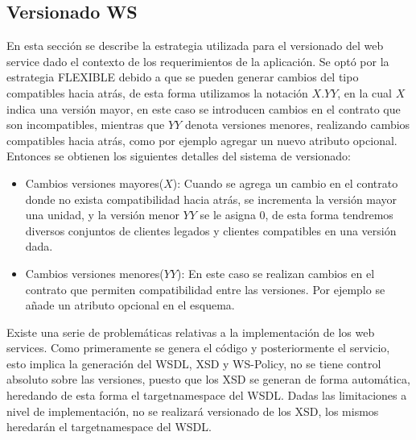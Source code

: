 \documentclass[12pt]{article}
\begin{document}
\subsection{Versionado WS}
En esta sección se describe la estrategia utilizada para el versionado del web service dado el contexto de los requerimientos de la aplicación.
Se optó por la estrategia FLEXIBLE debido a que se pueden generar cambios del tipo compatibles hacia atrás, de esta forma utilizamos la notación $X.YY$, en la cual $X$ indica una versión mayor, en este caso se introducen cambios en el contrato que son incompatibles, mientras que $YY$ denota versiones menores, realizando cambios compatibles hacia atrás, como por ejemplo agregar un nuevo atributo opcional. Entonces se obtienen los siguientes detalles del sistema de versionado:
\begin{itemize}
  \item Cambios versiones mayores($X$): Cuando se agrega un cambio en el contrato donde no exista compatibilidad hacia atrás, se incrementa la versión mayor una unidad, y la versión menor $YY$ se le asigna $0$, de esta forma tendremos diversos conjuntos de clientes legados y clientes compatibles en una versión dada.
  \item Cambios versiones menores($YY$): En este caso se realizan cambios en el contrato que permiten compatibilidad entre las versiones. Por ejemplo se añade un atributo opcional en el esquema.
\end{itemize}
Existe una serie de problemáticas relativas a la implementación de los web services. Como primeramente se genera el código y posteriormente el servicio, esto implica la generación del WSDL, XSD y WS-Policy, no se tiene control absoluto sobre las versiones, puesto que los XSD se generan de forma automática, heredando de esta forma el targetnamespace del WSDL. Dadas las limitaciones a nivel de implementación, no se realizará versionado de los XSD, los mismos heredarán el targetnamespace del WSDL.
\end{document}
